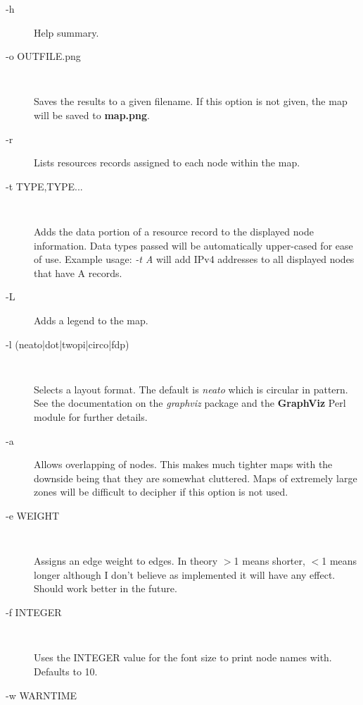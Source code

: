 \begin{description}

\item [-h]

Help summary.

\item [-o OUTFILE.png]\verb" "

Saves the results to a given filename.  If this option is not given, the map
will be saved to {\bf map.png}.

\item [-r]

Lists resources records assigned to each node within the map.

\item [-t TYPE,TYPE...]\verb" "

Adds the data portion of a resource record to the displayed node
information.  Data types passed will be automatically upper-cased for
ease of use.  Example usage: {\it -t A} will add IPv4 addresses to
all displayed nodes that have A records.

\item [-L]

Adds a legend to the map.

\item [-l (neato|dot|twopi|circo|fdp)]\verb" "

Selects a layout format.  The default is {\it neato} which is circular in
pattern.  See the documentation on the {\it graphviz} package and the
{\bf GraphViz} Perl module for further details.

\item [-a]

Allows overlapping of nodes.  This makes much tighter maps with the
downside being that they are somewhat cluttered.  Maps of extremely
large zones will be difficult to decipher if this option is not used.

\item [-e WEIGHT]\verb" "

Assigns an edge weight to edges.  In theory $>$1 means shorter, $<$1 means
longer although I don't believe as implemented it will have any
effect.  Should work better in the future.

\item [-f INTEGER]\verb" "

Uses the INTEGER value for the font size to print node names with.
Defaults to 10.

\item [-w WARNTIME]\verb" "


\end{description}
